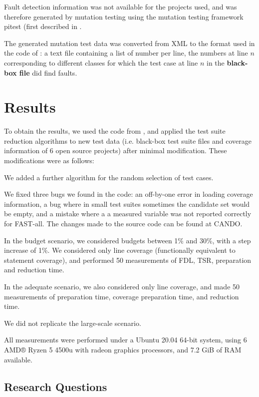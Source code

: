 Fault detection information was not available for the projects used,
and was therefore generated by mutation testing using the mutation
testing framework pitest (first described in \cite{budd1980mutation}.

The generated mutation test data was converted from XML to the format used
in the code of \cite{cruciani2019scalable}: a text file containing a list
of number per line, the numbers at line $n$ corresponding to different
classes for which the test case at line $n$ in the \textbf{black-box file}
did find faults.

\section{Results}

To obtain the results, we used the code from \cite{cruciani2019scalable},
and applied the test suite reduction algorithms to new test data
(i.e. black-box test suite files and coverage information of 6 open source
projects) after minimal modification. These modifications were as follows:

We added a further algorithm for the random selection of test cases.

We fixed three bugs we found in the code: an off-by-one error in loading
coverage information, a bug where in small test suites sometimes the
candidate set would be empty, and a mistake where a a measured variable
was not reported correctly for FAST-all. The changes made to the source
code can be found at CANDO.

In the budget scenario, we considered budgets between 1\% and 30\%, with
a step increase of 1\%. We considered only line coverage (functionally
equivalent to statement coverage), and performed 50 measurements of
FDL, TSR, preparation and reduction time.

In the adequate scenario, we also considered only line coverage, and
made 50 measurements of preparation time, coverage preparation time,
and reduction time.

We did not replicate the large-scale scenario.

All measurements were performed under a Ubuntu 20.04 64-bit system,
using 6 AMD® Ryzen 5 4500u with radeon graphics processors, and 7.2
GiB of RAM available.

\subsection{Research Questions}

